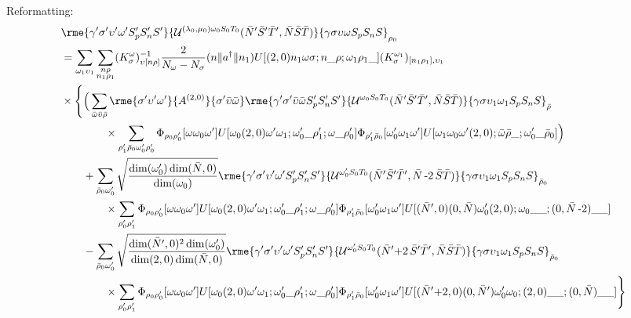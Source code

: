 \documentclass[%
  aps,%
  prc,%
  showpacs,%
  superscriptaddress,%
  onecolumn,%
  notitlepage,%
  11pt,%
  floatfix,%
  amsmath,%
  amssymb,%
]{revtex4-2}
\newcommand{\negative}{\,\text{-}}
\newcommand{\plus}{\text{+}}
\begin{document}
Reformatting:
\begin{align*}
  &\rme{\gamma'\sigma'\upsilon'\omega'S_p'S_n'S'}{\mathcal{U}^{(\lambda_0,\mu_0)\omega_0S_0T_0}(\bar{N}'\bar{S}'\bar{T}',\bar{N}\bar{S}\bar{T})}{\gamma\sigma\upsilon\omega S_pS_nS}_{\rho_0}\\
  &=\sum_{\omega_1\upsilon_1} \sum_{\substack{n\rho\\n_1\rho_1}}(K_\sigma^\omega)_{\upsilon[n\rho]}^{-1}\frac{2}{N_\omega - N_\sigma}(n\Vert{}a^\dagger\Vert{}n_1)U[(2,0)n_1\omega\sigma;n\_\rho;\omega_1\rho_1\_](K_\sigma^{\omega_1})_{[n_1\rho_1],\upsilon_1} \\
  &\times\Bigg\{\Big(\sum_{\bar{\omega}\bar{\upsilon}\bar{\rho}}
      \rme{\sigma'\upsilon'\omega'}{A^{(2,0)}}{\sigma'\bar{\upsilon}\bar{\omega}}
      \rme{\gamma'\sigma'\bar{\upsilon}\bar{\omega}S_p'S_n'S'}{\mathcal{U}^{\omega_0S_0T_0}(\bar{N}'\bar{S}'\bar{T}',\bar{N}\bar{S}\bar{T})}{\gamma\sigma\upsilon_1\omega_1S_pS_nS}_{\bar{\rho}}\\
  &\qquad\qquad\times \sum_{\rho_1'\bar{\rho}_0\omega_0'\rho_0'}\Phi_{\rho_0\rho_0'}[\omega\omega_0\omega']U[\omega_0(2,0)\omega'\omega_1;\omega_0'\_\rho_1';\omega\_\rho_0']\Phi_{\rho_1'\bar{\rho}_0}[\omega_0'\omega_1\omega']U[\omega_1\omega_0\omega'(2,0);\bar{\omega}\bar{\rho}\_;\omega_0'\_\bar{\rho}_0] \Big)\\
  &\qquad+\sum_{\bar{\rho}_0\omega_0'}\sqrt{\frac{\dim(\omega_0')\dim(\bar{N},0)}{\dim(\omega_0)}} \rme{\gamma'\sigma'\upsilon'\omega'S_p'S_n'S'}{\mathcal{U}^{\omega_0'S_0T_0}(\bar{N}'\bar{S}'\bar{T}',\bar{N}\negative2\,\bar{S}\bar{T})}{\gamma\sigma\upsilon_1\omega_1S_pS_nS}_{\bar{\rho}_0}\\
  &\qquad\qquad\times \sum_{\rho_0'\rho_1'}\Phi_{\rho_0\rho_0'}[\omega\omega_0\omega']U[\omega_0(2,0)\omega'\omega_1;\omega_0'\_\rho_1';\omega\_\rho_0']\Phi_{\rho_1'\bar{\rho}_0}[\omega_0'\omega_1\omega']U[(\bar{N}',0)(0,\bar{N})\omega_0'(2,0);\omega_0\_\_;(0,\bar{N}\negative2)\_\_]\\
  &\qquad-\sum_{\bar{\rho}_0\omega_0'}\sqrt{\frac{\dim(\bar{N}',0)^2\dim(\omega_0')}{\dim(2,0)\dim(\bar{N},0)}} \rme{\gamma'\sigma'\upsilon'\omega'S_p'S_n'S'}{\mathcal{U}^{\omega_0'S_0T_0}(\bar{N}'\plus2\,\bar{S}'\bar{T}',\bar{N}\bar{S}\bar{T})}{\gamma\sigma\upsilon_1\omega_1S_pS_nS}_{\bar{\rho}_0}\\
  &\qquad\qquad\times \sum_{\rho_0'\rho_1'}\Phi_{\rho_0\rho_0'}[\omega\omega_0\omega'] U[\omega_0(2,0)\omega'\omega_1;\omega_0'\_\rho_1';\omega\_\rho_0']\Phi_{\rho_1'\bar{\rho}_0}[\omega_0'\omega_1\omega']U[(\bar{N}'\plus2,0)(0,\bar{N}')\omega_0'\omega_0;(2,0)\_\_;(0,\bar{N})\_\_] \Bigg\}
\end{align*}
\end{document}

